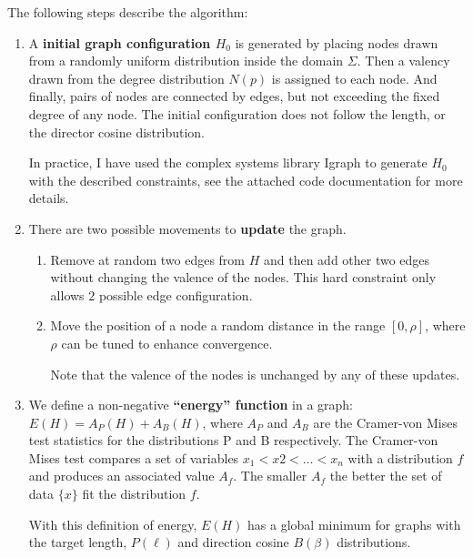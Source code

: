 The following steps describe the algorithm:
\begin{enumerate}[label=\textbf{\Roman*}]
  \item A \textbf{initial graph configuration $H_0$} is generated by placing
  nodes drawn from a randomly uniform distribution inside the domain $\Sigma$. Then a
  valency drawn from the degree distribution $N(p)$ is assigned to each node.
  And finally, pairs of nodes are connected by edges, but not exceeding the
  fixed degree of any node. The initial configuration does not follow
  the length, or the director cosine distribution.
  
  In practice, I have used the complex systems library Igraph to generate $H_0$
  with the described constraints, see the attached code documentation for more
  details.
  \item There are two possible movements to \textbf{update} the graph.
    \begin{enumerate}[label=\textbf{\alph*)}]
    \item Remove at random two edges from $H$ and then add other two edges
    without changing the valence of the nodes. This hard constraint only allows
    $2$ possible edge configuration.
    \item Move the position of a node a random distance in the range $[0,\rho]$,
    where $\rho$ can be tuned to enhance convergence.
    
    Note that the valence of the nodes is unchanged by any of these updates.
  \end{enumerate} 
  
  \item We define a non-negative \textbf{``energy'' function} in a graph:
  $E(H)=A_P(H) + A_B(H)$, where $A_P$ and $A_B$ are the Cramer-von Mises test
  statistics for the distributions P and B respectively. The Cramer-von Mises
  test \citep{anderson_distribution_1962} compares a set of variables $x_1<x2<\ldots<x_n$ with a
  distribution $f$ and produces an associated value $A_f$. The smaller $A_f$ the better the set
  of data $\{x\}$ fit the distribution $f$.
  
  With this definition of energy, $E(H)$ has a global minimum for graphs with
  the target length, $P(\ell)$ and direction cosine $B(\beta)$ distributions.
  

\end{enumerate}
